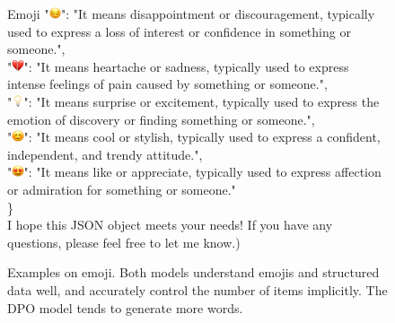 \begin{figure}[]
{\begin{AIbox}{Emoji}
{{"\includegraphics[height=10pt]{Fig/pensive-face_1f614.png}": "It means disappointment or discouragement, typically used to express a loss of interest or confidence in something or someone.", \\
"\includegraphics[height=10pt]{Fig/broken-heart_1f494.png}": "It means heartache or sadness, typically used to express intense feelings of pain caused by something or someone.", \\
"\includegraphics[height=10pt]{Fig/light-bulb_1f4a1.png}": "It means surprise or excitement, typically used to express the emotion of discovery or finding something or someone.",\\
"\includegraphics[height=10pt]{Fig/smiling-face-with-smiling-eyes_1f60a.png}": "It means cool or stylish, typically used to express a confident, independent, and trendy attitude.",\\
"\includegraphics[height=10pt]{Fig/smiling-face-with-heart-eyes_1f60d.png}": "It means like or appreciate, typically used to express affection or admiration for something or someone."\\
\} \\
I hope this JSON object meets your needs! If you have any questions, please feel free to let me know.})
}
\hspace{0.01\linewidth}
\end{AIbox}
}
\caption{Examples on emoji. Both models understand emojis and structured data well, and accurately control the number of items implicitly. The DPO model tends to generate more words. }
\label{fig:emoji}
\end{figure}